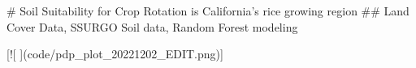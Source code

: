# Soil Suitability for Crop Rotation is California's rice growing region  
## Land Cover Data, SSURGO Soil data, Random Forest modeling  



[![ ](code/pdp_plot_20221202_EDIT.png)]
